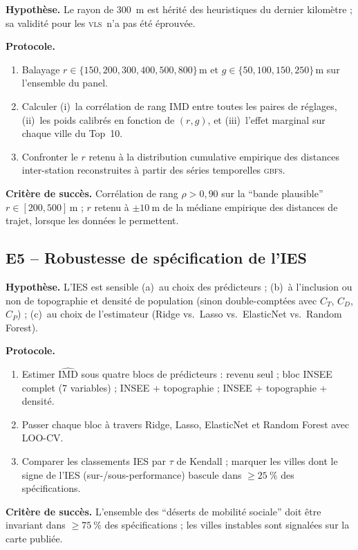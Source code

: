 \documentclass[11pt,a4paper]{article}
\newcommand{\IMD}{\mathrm{IMD}}
\newcommand{\VLS}{\textsc{vls}\xspace}
\newcommand{\GBFS}{\textsc{gbfs}\xspace}
\begin{document}
\begin{experience}[title=E4 -- Géométrie multi-échelle de la
composante de couverture]
\textbf{Hypothèse.} Le rayon de \SI{300}{\metre} est hérité des
heuristiques du dernier kilomètre \citep{ElGeneidy2016} ; sa
validité pour les \VLS\ n'a pas été éprouvée.

\textbf{Protocole.}
\begin{enumerate}[leftmargin=*,itemsep=0.2em]
    \item Balayage
    $r \in \{150, 200, 300, 400, 500, 800\}\,\si{\metre}$ et
    $g \in \{50, 100, 150, 250\}\,\si{\metre}$ sur l'ensemble du
    panel.
    \item Calculer (i)~la corrélation de rang IMD entre toutes
    les paires de réglages, (ii)~les poids calibrés en fonction
    de $(r, g)$, et (iii)~l'effet marginal sur chaque ville du
    Top~10.
    \item Confronter le $r$ retenu à la distribution cumulative
    empirique des distances inter-station reconstruites à partir
    des séries temporelles \GBFS.
\end{enumerate}

\textbf{Critère de succès.} Corrélation de rang $\rho > 0{,}90$
sur la \enquote{bande plausible}
$r \in [200, 500]\,\si{\metre}$ ; $r$ retenu à $\pm
\SI{10}{\metre}$ de la médiane empirique des distances de
trajet, lorsque les données le permettent.
\end{experience}

\subsection{E5 -- Robustesse de spécification de l'IES}

\begin{experience}[title=E5 -- Spécifications alternatives de
l'IMD attendu]
\textbf{Hypothèse.} L'IES est sensible (a)~au choix des
prédicteurs ; (b)~à l'inclusion ou non de topographie et densité
de population (sinon double-comptées avec $C_T$, $C_D$, $C_P$) ;
(c)~au choix de l'estimateur (Ridge vs.\ Lasso vs.\ ElasticNet
vs.\ Random Forest).

\textbf{Protocole.}
\begin{enumerate}[leftmargin=*,itemsep=0.2em]
    \item Estimer $\widehat{\IMD}$ sous quatre blocs de
    prédicteurs : revenu seul ; bloc INSEE complet (7 variables) ;
    INSEE + topographie ; INSEE + topographie + densité.
    \item Passer chaque bloc à travers Ridge, Lasso, ElasticNet
    et Random Forest avec LOO-CV.
    \item Comparer les classements IES par $\tau$ de Kendall ;
    marquer les villes dont le signe de l'IES (sur-/sous-performance)
    bascule dans $\geq\SI{25}{\percent}$ des spécifications.
\end{enumerate}

\textbf{Critère de succès.} L'ensemble des \enquote{déserts de
mobilité sociale} doit être invariant dans
$\geq\SI{75}{\percent}$ des spécifications ; les villes instables
sont signalées sur la carte publiée.
\end{experience}
\end{document}
